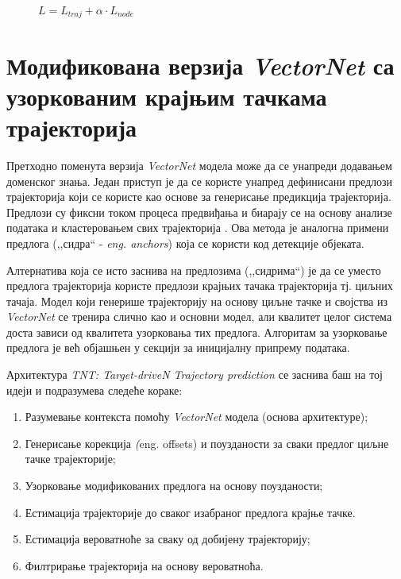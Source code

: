 \documentclass[11pt,oneside]{memoir}
\begin{document}
\begin{figure}[H]
  \centering
  $L = L_{traj} + \alpha \cdot L_{node}$
\end{figure}

\section{Модификована верзија \textit{VectorNet} са узоркованим крајњим тачкама трајекторија}

Претходно поменута верзија \textit{VectorNet} модела може да се унапреди додавањем доменског знања. Један приступ је да се користе унапред
дефинисани предлози трајекторија који се користе као основе за генерисање предикција трајекторија. Предлози су фиксни током процеса
предвиђања и биарају се на основу анализе података и кластеровањем свих трајекторија \cite{multipath}.
Ова метода је аналогна примени предлога (,,сидра`` - \textit{eng. anchors}) која се користи код детекције објеката.

Алтернатива која се исто заснива на предлозима (,,сидрима``) је да се уместо предлога трајекторија користе предлози крајњих тачака трајекторија
тј. циљних тачаја. Модел који генерише трајекторију на основу циљне тачке и својства из \textit{VectorNet} се тренира слично као и основни модел, 
али квалитет целог система доста зависи од квалитета узорковања тих предлога. Алгоритам за узорковање предлога је већ објашњен у секцији за
иницијалну припрему података.

Архитектура \textit{TNT: Target-driveN Trajectory prediction} \cite{tnt} се заснива баш на тој идеји и подразумева следеће кораке:
\begin{enumerate}
  \item Разумевање контекста помоћу \textit{VectorNet} модела (основа архитектуре);
  \item Генерисање корекција \textit(eng. offsets) и поузданости за сваки предлог циљне тачке трајекторије;
  \item Узорковање модификованих предлога на основу поузданости;
  \item Естимација трајекторије до сваког изабраног предлога крајње тачке.
  \item Естимација вероватноће за сваку од добијену трајекторију;
  \item Филтрирање трајекторија на основу вероватноћа.
\end{enumerate}
\end{document}
